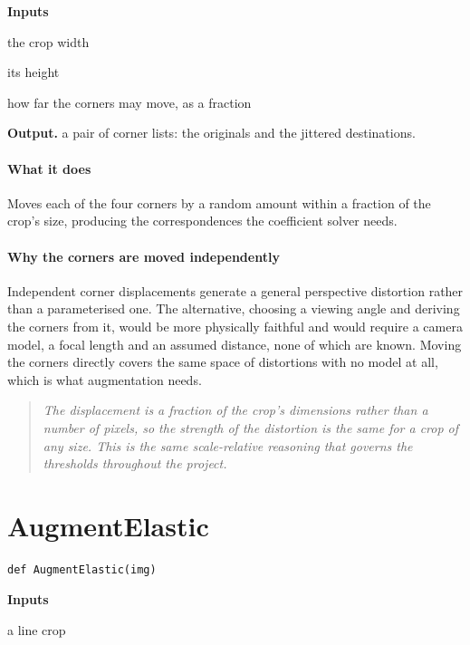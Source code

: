 \noindent\textbf{Inputs}
\begin{description}[leftmargin=2.2em,style=nextline,font=\normalfont\ttfamily]\setlength\itemsep{1pt}
  \item[{width}] \normalfont the crop width
  \item[{height}] \normalfont its height
  \item[{DistortionScale}] \normalfont how far the corners may move, as a fraction
\end{description}

\noindent\textbf{Output.} a pair of corner lists: the originals and the jittered destinations.


\paragraph{What it does}
Moves each of the four corners by a random amount within a fraction of the crop's size, producing the correspondences the coefficient solver needs.


\paragraph{Why the corners are moved independently}
Independent corner displacements generate a general perspective distortion rather than a parameterised one. The alternative, choosing a viewing angle and deriving the corners from it, would be more physically faithful and would require a camera model, a focal length and an assumed distance, none of which are known. Moving the corners directly covers the same space of distortions with no model at all, which is what augmentation needs.


\begin{quote}\small\itshape The displacement is a fraction of the crop's dimensions rather than a number of pixels, so the strength of the distortion is the same for a crop of any size. This is the same scale-relative reasoning that governs the thresholds throughout the project.\end{quote}

\section{AugmentElastic}
\begin{lstlisting}[style=sig]
def AugmentElastic(img)
\end{lstlisting}

\noindent\textbf{Inputs}
\begin{description}[leftmargin=2.2em,style=nextline,font=\normalfont\ttfamily]\setlength\itemsep{1pt}
  \item[{img}] \normalfont a line crop
\end{description}

